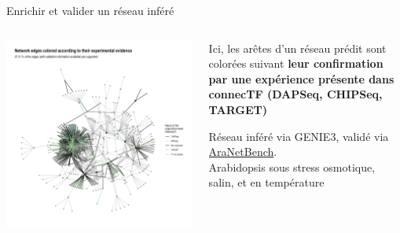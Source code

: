 \begin{frame}{Enrichir et valider un réseau inféré}

\begin{columns}
\begin{column}{.5\textwidth}
\vspace{-0.1cm}
\includegraphics[scale = 0.21]{Figures/analyse/validation.png}
\end{column}
\begin{column}{.3\textwidth}
\vspace{-0.2cm}
\begin{block}{}
\scriptsize Ici, les arêtes d'un réseau prédit sont colorées suivant \textbf{leur confirmation par une expérience présente dans connecTF (DAPSeq, CHIPSeq, TARGET)}
\end{block}
\scriptsize Réseau inféré via GENIE3, validé via \href{https://oceanecsn.github.io/AraNetBench/}{AraNetBench}. \\ Arabidopsis sous stress osmotique, salin, et en température
\end{column}
\end{columns}
\end{frame}



